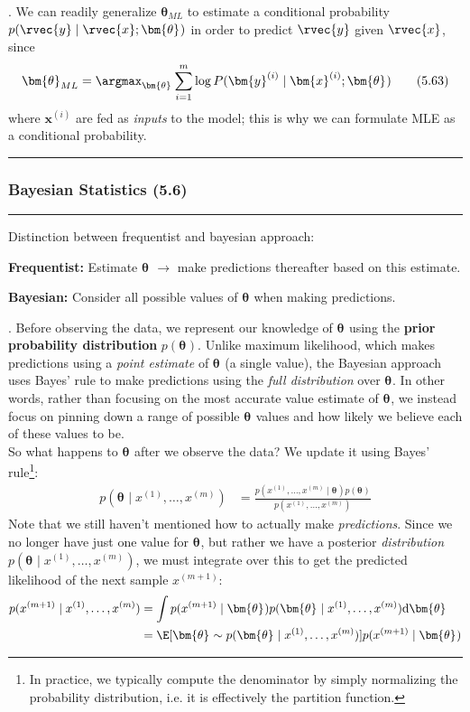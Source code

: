 \documentclass[11pt]{article}
\renewcommand\vec[2][]{\bm{#2}_{#1}}
\newcommand\myspace[1][]{\vspace{#1\bigskipamount}}
\newcommand\p{\Needspace{10\baselineskip} \noindent}
\newcommand\tlab[1]{\tag{#1}\label{#1}}
\newcommand\subsub[1]{\Needspace{15\baselineskip}\hrule\subsubsection{#1}\hrule}
\begin{document}
\myspace
\p {}. We can readily generalize $\vec[ML]{\theta}$ to estimate a conditional probability $p(\rvec{y} \mid \rvec{x}; \vec{\theta})$ in order to predict $\rvec{y}$ given $\rvec{x}$, since
\begin{align}
\vec[ML]{\theta} = \argmax_{\vec{\theta}} \sum_{i = 1}^{m} \log P(\vec{y}^{(i)} \mid \vec{x}^{(i)} ; \vec{\theta}) \tlab{5.63}
\end{align}
where $\vec{x}^{(i)}$ are fed as \textit{inputs} to the model; this is why we can formulate MLE as a conditional probability. 

\myspace\myspace
\subsub{Bayesian Statistics (5.6)}

Distinction between frequentist and bayesian approach:
\begin{compactitem}
	\item \textbf{Frequentist:} Estimate $\vec{\theta}$ $\longrightarrow$ make predictions thereafter based on this estimate.
	\item \textbf{Bayesian:} Consider all possible values of $\vec{\theta}$ when making predictions.
\end{compactitem}

\myspace
\p {}. Before observing the data, we represent our knowledge of $\vec{\theta}$ using the \textbf{prior probability distribution} $p(\vec{\theta})$. Unlike maximum likelihood, which makes predictions using a \textit{point estimate} of $\vec{\theta}$ (a single value), the Bayesian approach uses Bayes' rule to make predictions using the \textit{full distribution} over $\vec{\theta}$. In other words, rather than focusing on the most accurate value estimate of $\vec{\theta}$, we instead focus on pinning down a range of possible $\vec{\theta}$ values and how likely we believe each of these values to be. \\

So what happens to $\vec{\theta}$ after we observe the data? We update it using Bayes' rule\footnote{In practice, we typically compute the denominator by simply normalizing the probability distribution, i.e. it is effectively the partition function.}:
\begin{align}
	p(\vec{\theta} \mid x^{(1)}, \ldots, x^{(m)}) 
	&= \frac{ p(x^{(1)}, \ldots, x^{(m)} \mid \vec{\theta} ) p(\vec{\theta}) }{ p(x^{(1)}, \ldots, x^{(m)}) } 
\end{align}
Note that we still haven't mentioned how to actually make \textit{predictions}. Since we no longer have just one value for $\vec{\theta}$, but rather we have a posterior \textit{distribution} $p(\vec{\theta} \mid x^{(1)}, \ldots, x^{(m)})$, we must integrate over this to get the predicted likelihood of the next sample $x^{(m+1)}$:
\begin{align}
	p(x^{(m+1)} \mid x^{(1)}, \ldots, x^{(m)}) 
	&= \int p(x^{(m+1)} \mid \vec{\theta} ) p(\vec{\theta} \mid x^{(1)}, \ldots, x^{(m)}) \mathrm{d}\vec{\theta} \\
	&= \E[\vec{\theta} \sim p(\vec{\theta} \mid x^{(1)}, \ldots, x^{(m)})]{p(x^{(m+1)} \mid \vec{\theta} )}
\end{align}
\end{document}
